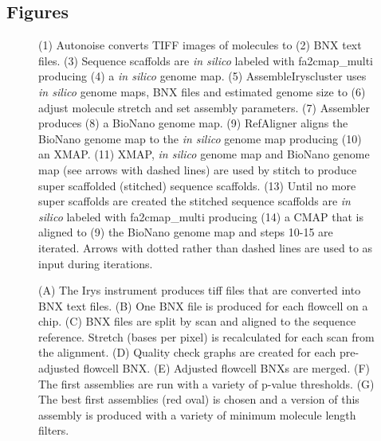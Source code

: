 \documentclass{bmcart}
\begin{document}
\begin{backmatter}

\section*{Figures}
  \begin{figure}[h!]
  	\caption{
  		(1) Autonoise converts TIFF images of molecules to (2) BNX text files. (3) Sequence scaffolds are \textit{in silico} labeled with fa2cmap\_multi producing (4) a \textit{in silico} genome map. (5) AssembleIryscluster uses \textit{in silico} genome maps, BNX files and estimated genome size to (6) adjust molecule stretch and set assembly parameters. (7) Assembler produces (8) a BioNano genome map. (9) RefAligner aligns the BioNano genome map to the \textit{in silico} genome map producing (10) an XMAP. (11) XMAP, \textit{in silico} genome map and BioNano genome map (see arrows with dashed lines) are used by stitch to produce super scaffolded (stitched) sequence scaffolds. (13) Until no more super scaffolds are created the stitched sequence scaffolds are \textit{in silico} labeled with fa2cmap\_multi producing (14) a CMAP that is aligned to (9) the BioNano genome map and steps 10-15 are iterated. Arrows with dotted rather than dashed lines are used to as input during iterations.}
  \end{figure}
  \begin{figure}[h!]
  	\caption{
  		(A) The Irys instrument produces tiff files that are converted into BNX text files. (B) One BNX file is produced for each flowcell on a chip. (C) BNX files are split by scan and aligned to the sequence reference. Stretch (bases per pixel) is recalculated for each scan from the alignment. (D) Quality check graphs are created for each pre-adjusted flowcell BNX. (E) Adjusted flowcell BNXs are merged. (F) The first assemblies are run with a variety of p-value thresholds. (G) The best first assemblies (red oval) is chosen and a version of this assembly is produced with a variety of minimum molecule length filters.}
  \end{figure}
  \begin{figure}[h!]
  \caption{
}
\end{figure}
\end{backmatter}
\end{document}

